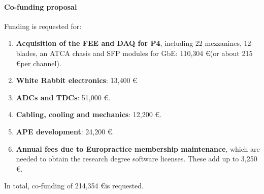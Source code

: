 \paragraph{Co-funding proposal}
Funding is requested for:

\begin{enumerate}
\item {\bf Acquisition of the FEE and DAQ for P4}, including 22 mezzanines, 12 blades, an ATCA chasis and SFP modules for GbE:   110,304 \euro (or about 215 \euro per channel).
\item {\bf White Rabbit electronics}: 13,400 \euro
\item {\bf ADCs and TDCs}: 51,000 \euro.
\item {\bf Cabling, cooling and mechanics}: 12,200 \euro.
\item {\bf APE development}: 24,200 \euro.
\item {\bf Annual fees due to Europractice membership maintenance}, which are needed to obtain the  research degree software licenses. These add up to 3,250 \euro.
\end{enumerate}

In total, co-funding of 214,354 \euro is requested. 
